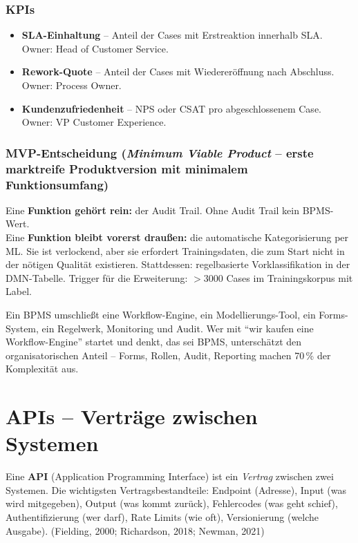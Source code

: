 \documentclass[11pt,a4paper,oneside]{article}
\newcommand{\fachbegriff}[1]{\textbf{#1}}
\newcommand{\quelle}[1]{{\footnotesize\color{lpGray}(#1)}}
\begin{document}
\subsubsection{KPIs}

\begin{itemize}
  \item \fachbegriff{SLA-Einhaltung} -- Anteil der Cases mit Erstreaktion innerhalb SLA. Owner: Head of Customer Service.
  \item \fachbegriff{Rework-Quote} -- Anteil der Cases mit Wiedereröffnung nach Abschluss. Owner: Process Owner.
  \item \fachbegriff{Kundenzufriedenheit} -- NPS oder CSAT pro abgeschlossenem Case. Owner: VP Customer Experience.
\end{itemize}

\subsubsection{MVP-Entscheidung (\emph{Minimum Viable Product} -- erste marktreife Produktversion mit minimalem Funktionsumfang)}

Eine \fachbegriff{Funktion gehört rein:} der Audit Trail. Ohne Audit Trail kein BPMS-Wert. \\
Eine \fachbegriff{Funktion bleibt vorerst draußen:} die automatische Kategorisierung per ML. Sie ist verlockend, aber sie erfordert Trainingsdaten, die zum Start nicht in der nötigen Qualität existieren. Stattdessen: regelbasierte Vorklassifikation in der DMN-Tabelle. Trigger für die Erweiterung: $>$3000 Cases im Trainingskorpus mit Label.

\begin{merkbox}
Ein BPMS umschließt eine Workflow-Engine, ein Modellierungs-Tool, ein Forms-System, ein Regelwerk, Monitoring und Audit. Wer mit ``wir kaufen eine Workflow-Engine'' startet und denkt, das sei BPMS, unterschätzt den organisatorischen Anteil -- Forms, Rollen, Audit, Reporting machen 70\,\% der Komplexität aus.
\end{merkbox}

\section{APIs -- Verträge zwischen Systemen}

Eine \fachbegriff{API} (Application Programming Interface) ist ein \emph{Vertrag} zwischen zwei Systemen. Die wichtigsten Vertragsbestandteile: Endpoint (Adresse), Input (was wird mitgegeben), Output (was kommt zurück), Fehlercodes (was geht schief), Authentifizierung (wer darf), Rate Limits (wie oft), Versionierung (welche Ausgabe). \quelle{Fielding, 2000; Richardson, 2018; Newman, 2021}
\end{document}
